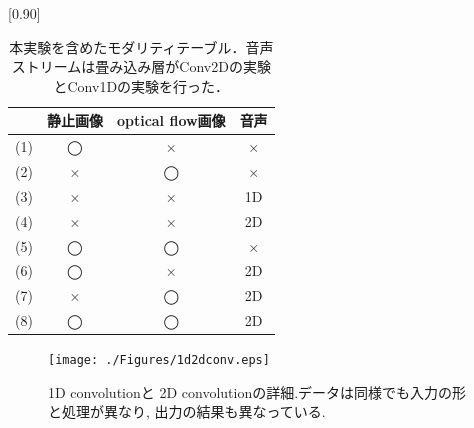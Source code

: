 \documentclass[MIRU,submit]{miru2019j}
\begin{document}
\begin{table}[tb]
 \centering
 \caption{本実験を含めたモダリティテーブル．音声ストリームは畳み込み層がConv2Dの実験とConv1Dの実験を行った．}\label{ablation}
 \scalebox{0.90}[0.90]{
  \begin{tabular}{|l||c|c|c|}
\hline \hline
&静止画像&optical flow画像&音声 \\ \hline \hline
(1) & ◯ & × & × \\ \hline
(2) & × & ◯ & × \\ \hline
(3) & × & × &1D \\ \hline
(4) & × & × &2D \\ \hline
(5) & ◯ & ◯ & × \\ \hline
(6) & ◯ & × &2D\\ \hline
(7) & × & ◯ &2D\\ \hline
(8) & ◯ & ◯ &2D\\ \hline

  \end{tabular}
 }
\end{table}

\begin{figure}[tb]
   \begin{center}
    \texttt{[image: ./Figures/1d2dconv.eps]}
    \caption{1D convolutionと 2D convolutionの詳細.データは同様でも入力の形と処理が異なり, 出力の結果も異なっている.}
    \label{1d2dconv}
   \end{center}
\end{figure}
\end{document}
